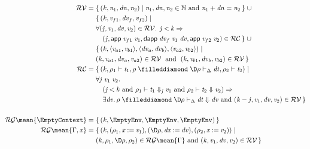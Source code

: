 \begin{figure}[h!]
\begin{align*}
  \ensuremath{\mathcal{RV}} ={}& \{ \, \ensuremath{(\Varid{k},\Varid{n}_{1},\Varid{dn},\Varid{n}_{2})\mid\Varid{n}_{1},\Varid{dn},\Varid{n}_{2}\in \mathbb{N}\text{ and }\Varid{n}_{1}\mathbin{+}\Varid{dn}\mathrel{=}\Varid{n}_{2}} \, \} \ensuremath{\;\cup\\&}\{ \, \ensuremath{(\Varid{k},\Varid{v}_{f1},\Varid{dv}_f,\Varid{v}_{f2})\mid\\&\forall (\Varid{j},\Varid{v}_{1},\Varid{dv},\Varid{v}_{2})\in \mathcal{RV}\hsforall \hsdot{\circ }{\mathpunct{.}}\;\Varid{j}\mathbin{<}\Varid{k}\Rightarrow\\&\quad(\Varid{j},\mathsf{app}\;\Varid{v}_{f1}\;\Varid{v}_{1},\mathsf{dapp}\;\Varid{dv}_f\;\Varid{v}_{1}\;\Varid{dv},\mathsf{app}\;\Varid{v}_{f2}\;\Varid{v}_{2})\in \mathcal{RC}} \, \}\ensuremath{\;\cup\\&} \{ \, \ensuremath{(\Varid{k},\langle\Varid{v}_{a1},\Varid{v}_{b1}\rangle,\langle\Varid{dv}_a,\Varid{dv}_b\rangle,\langle\Varid{v}_{a2},\Varid{v}_{b2}\rangle)\mid\\&(\Varid{k},\Varid{v}_{a1},\Varid{dv}_a,\Varid{v}_{a2})\in \mathcal{RV}\;\text{ and }\;(\Varid{k},\Varid{v}_{b1},\Varid{dv}_b,\Varid{v}_{b2})\in \mathcal{RV}} \, \}\\
  \ensuremath{\mathcal{RC}} ={}&
                  \{ \, \ensuremath{(\Varid{k},\rho_{1}\vdash\Varid{t}_{1},\rho\mathrel{\filleddiamond}\D\rho\vdash_{\Delta}\Varid{dt},\rho_{2}\vdash\Varid{t}_{2})\mid\\&\forall \Varid{j}\hsforall \;\Varid{v}_{1}\;\Varid{v}_{2}\hsdot{\circ }{\mathpunct{.}}\\&\quad(\Varid{j}\mathbin{<}\Varid{k}\text{ and }\rho_{1}\vdash\Varid{t}_{1}\Downarrow_{\Varid{j}}\Varid{v}_{1}\text{ and }\rho_{2}\vdash\Varid{t}_{2}\Downarrow\Varid{v}_{2})\Rightarrow\\&\quad\exists \Varid{dv}\hsforall \hsdot{\circ }{\mathpunct{.}}\rho\mathrel{\filleddiamond}\D\rho\vdash_{\Delta}\Varid{dt}\Downarrow\Varid{dv}\text{ and }(\Varid{k}\mathbin{-}\Varid{j},\Varid{v}_{1},\Varid{dv},\Varid{v}_{2})\in \mathcal{RV}} \, \}\\
  \\
  \ensuremath{\mathcal{RG}\mean{\EmptyContext}} ={} & \{ \, \ensuremath{(\Varid{k},\EmptyEnv,\EmptyEnv,\EmptyEnv)} \, \} \\
  \ensuremath{\mathcal{RG}\mean{\Gamma,\Varid{x}}} ={} &
                                  \{ \, \ensuremath{(\Varid{k},(\rho_{1},\Varid{x}\mathbin{:=}\Varid{v}_{1}),(\D\rho,\Varid{dx}\mathbin{:=}\Varid{dv}),(\rho_{2},\Varid{x}\mathbin{:=}\Varid{v}_{2}))\mid\\&(\Varid{k},\rho_{1},\D\rho,\rho_{2})\in \mathcal{RG}\mean{\Gamma}\text{ and }(\Varid{k},\Varid{v}_{1},\Varid{dv},\Varid{v}_{2})\in \mathcal{RV}} \, \} \\

\end{align*}
\end{figure}
